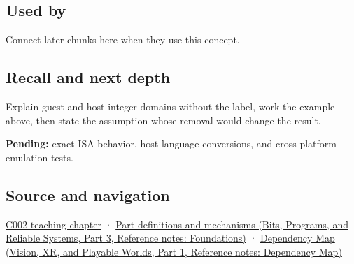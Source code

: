\subsection{Used by}\label{appendix-33e7a011b684-used-by}

\hypertarget{appendix-33e7a011b684-used-by}{}

Connect later chunks here when they use this concept.

\subsection{Recall and next depth}\label{appendix-33e7a011b684-recall-and-next-depth}

\hypertarget{appendix-33e7a011b684-recall-and-next-depth}{}

Explain guest and host integer domains without the label, work the example above, then state the assumption whose removal would change the result.

\textbf{Pending:} exact ISA behavior, host-language conversions, and cross-platform emulation tests.

\subsection{Source and navigation}\label{appendix-33e7a011b684-source-and-navigation}

\hypertarget{appendix-33e7a011b684-source-and-navigation}{}

\hyperref[01-foundations-i-ch001-arithmetic-becomes-a-policy]{C002 teaching chapter} · \href{../01-Bits-Programs-and-Reliable-Systems-P03/main.pdf\#nameddest=appendix-fd090d982a15}{Part definitions and mechanisms (Bits, Programs, and Reliable Systems, Part 3, Reference notes: Foundations)} · \href{../07-Vision-XR-and-Playable-Worlds-P01/main.pdf\#nameddest=appendix-4ad47bdd269a}{Dependency Map (Vision, XR, and Playable Worlds, Part 1, Reference notes: Dependency Map)}
